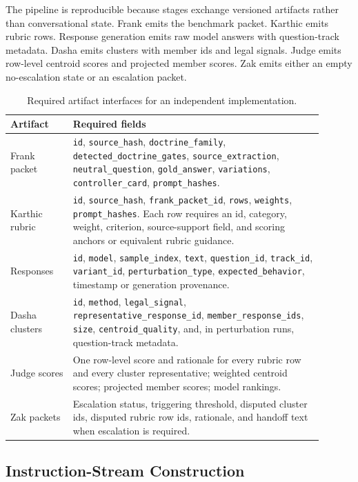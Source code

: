 The pipeline is reproducible because stages exchange versioned artifacts rather
than conversational state. Frank emits the benchmark packet. Karthic emits
rubric rows. Response generation emits raw model answers with question-track
metadata. Dasha emits clusters with member ids and legal signals. Judge emits
row-level centroid scores and projected member scores. Zak emits either an empty
no-escalation state or an escalation packet.

\begin{table}[h]
\centering
\caption{Required artifact interfaces for an independent implementation.}
\label{tab:artifact-contract}
\begin{tabular}{p{0.18\linewidth}p{0.72\linewidth}}
\toprule
Artifact & Required fields \\
\midrule
Frank packet & \texttt{id}, \texttt{source\_hash}, \texttt{doctrine\_family}, \texttt{detected\_doctrine\_gates}, \texttt{source\_extraction}, \texttt{neutral\_question}, \texttt{gold\_answer}, \texttt{variations}, \texttt{controller\_card}, \texttt{prompt\_hashes}. \\
Karthic rubric & \texttt{id}, \texttt{source\_hash}, \texttt{frank\_packet\_id}, \texttt{rows}, \texttt{weights}, \texttt{prompt\_hashes}. Each row requires an id, category, weight, criterion, source-support field, and scoring anchors or equivalent rubric guidance. \\
Responses & \texttt{id}, \texttt{model}, \texttt{sample\_index}, \texttt{text}, \texttt{question\_id}, \texttt{track\_id}, \texttt{variant\_id}, \texttt{perturbation\_type}, \texttt{expected\_behavior}, timestamp or generation provenance. \\
Dasha clusters & \texttt{id}, \texttt{method}, \texttt{legal\_signal}, \texttt{representative\_response\_id}, \texttt{member\_response\_ids}, \texttt{size}, \texttt{centroid\_quality}, and, in perturbation runs, question-track metadata. \\
Judge scores & One row-level score and rationale for every rubric row and every cluster representative; weighted centroid scores; projected member scores; model rankings. \\
Zak packets & Escalation status, triggering threshold, disputed cluster ids, disputed rubric row ids, rationale, and handoff text when escalation is required. \\
\bottomrule
\end{tabular}
\end{table}

\subsection{Instruction-Stream Construction}

